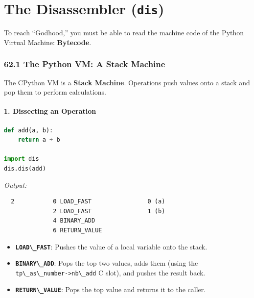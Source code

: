 \hypertarget{the-disassembler-dis}{%
\chapter{\texorpdfstring{The Disassembler
(\texttt{dis})}{The Disassembler (dis)}}\label{the-disassembler-dis}}

To reach ``Godhood,'' you must be able to read the machine code of the
Python Virtual Machine: \textbf{Bytecode}.

\hypertarget{the-python-vm-a-stack-machine}{%
\subsection{62.1 The Python VM: A Stack
Machine}\label{the-python-vm-a-stack-machine}}

The CPython VM is a \textbf{Stack Machine}. Operations push values onto
a stack and pop them to perform calculations.

\hypertarget{dissecting-an-operation}{%
\subsubsection{1. Dissecting an
Operation}\label{dissecting-an-operation}}

\begin{lstlisting}[language=Python]
def add(a, b):
    return a + b

import dis
dis.dis(add)
\end{lstlisting}

\emph{Output:}

\begin{lstlisting}
  2           0 LOAD_FAST                0 (a)
              2 LOAD_FAST                1 (b)
              4 BINARY_ADD
              6 RETURN_VALUE
\end{lstlisting}

\begin{itemize}
\tightlist
\item
  \textbf{\passthrough{\lstinline!LOAD\_FAST!}}: Pushes the value of a
  local variable onto the stack.
\item
  \textbf{\passthrough{\lstinline!BINARY\_ADD!}}: Pops the top two
  values, adds them (using the
  \passthrough{\lstinline!tp\_as\_number->nb\_add!} C slot), and pushes
  the result back.
\item
  \textbf{\passthrough{\lstinline!RETURN\_VALUE!}}: Pops the top value
  and returns it to the caller.
\end{itemize}

